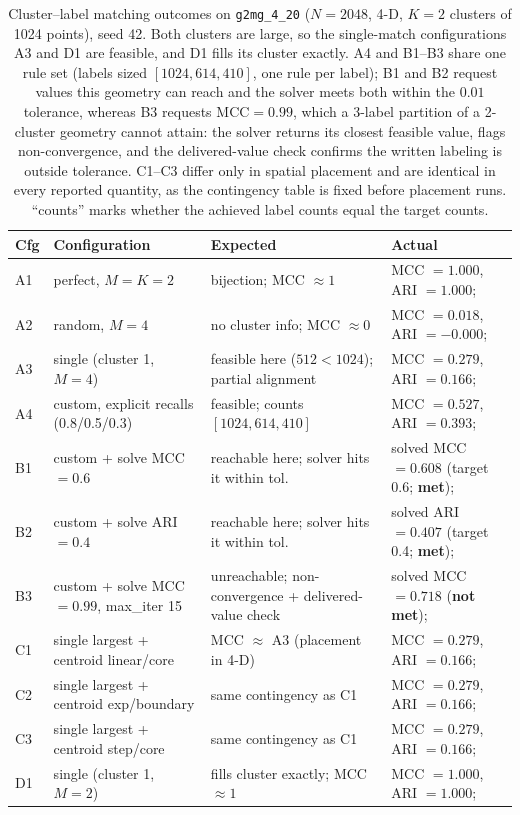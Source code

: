 \documentclass[a4paper,12pt]{article}
\begin{document}
\begin{table}[!h]
\centering\tiny
\begin{tabular}{@{}l p{3.5cm} p{4.0cm} p{4.6cm}@{}}
\toprule
\textbf{Cfg} & \textbf{Configuration} & \textbf{Expected} & \textbf{Actual} \\
\midrule
A1 & perfect, $M{=}K{=}2$ & bijection; MCC $\approx 1$ & MCC $=1.000$, ARI $=1.000$;\\
A2 & random, $M{=}4$ & no cluster info; MCC $\approx 0$ & MCC $=0.018$, ARI $=-0.000$;\\
A3 & single (cluster 1, $M{=}4$) & feasible here ($512<1024$); partial alignment & MCC $=0.279$, ARI $=0.166$;\\
A4 & custom, explicit recalls (0.8/0.5/0.3) & feasible; counts $[1024,614,410]$ & MCC $=0.527$, ARI $=0.393$;\\
B1 & custom + solve MCC$=0.6$ & reachable here; solver hits it within tol. & solved MCC $=0.608$ (target 0.6; \textbf{met});\\
B2 & custom + solve ARI$=0.4$ & reachable here; solver hits it within tol. & solved ARI $=0.407$ (target 0.4; \textbf{met});\\
B3 & custom + solve MCC$=0.99$, max\_iter 15 & unreachable; non-convergence + delivered-value check & solved MCC $=0.718$ (\textbf{not met});\\
C1 & single largest + centroid linear/core & MCC $\approx$ A3 (placement in 4-D) & MCC $=0.279$, ARI $=0.166$;\\
C2 & single largest + centroid exp/boundary & same contingency as C1 & MCC $=0.279$, ARI $=0.166$;\\
C3 & single largest + centroid step/core & same contingency as C1 & MCC $=0.279$, ARI $=0.166$;\\
D1 & single (cluster 1, $M{=}2$) & fills cluster exactly; MCC $\approx 1$ & MCC $=1.000$, ARI $=1.000$;\\
\bottomrule
\end{tabular}
\caption{Cluster--label matching outcomes on \texttt{g2mg\_4\_20} ($N=2048$, 4-D, $K=2$ clusters of 1024 points), seed 42. Both clusters are large, so the single-match configurations A3 and D1 are feasible, and D1 fills its cluster exactly. A4 and B1--B3 share one rule set (labels sized $[1024,614,410]$, one rule per label); B1 and B2 request values this geometry can reach and the solver meets both within the $0.01$ tolerance, whereas B3 requests $\mathrm{MCC}=0.99$, which a 3-label partition of a 2-cluster geometry cannot attain: the solver returns its closest feasible value, flags non-convergence, and the delivered-value check confirms the written labeling is outside tolerance. C1--C3 differ only in spatial placement and are identical in every reported quantity, as the contingency table is fixed before placement runs. ``counts'' marks whether the achieved label counts equal the target counts.}
\label{tab:g2mg-outcomes}
\end{table}
\end{document}
